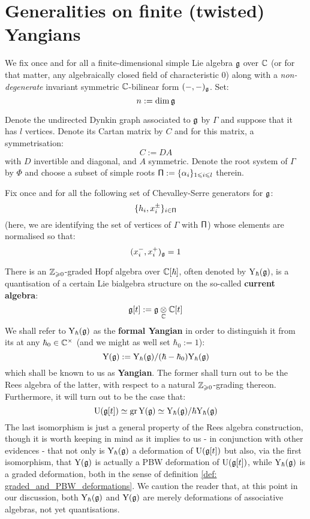 \section{Generalities on finite (twisted) Yangians}
    \begin{convention} \label{conv: a_fixed_semi_simple_lie_algebra}
        We fix once and for all a finite-dimensional simple Lie algebra $\mathfrak{g}$ over $\mathbb{C}$ (or for that matter, any algebraically closed field of characteristic $0$) along with a \textit{non-degenerate} invariant symmetric $\mathbb{C}$-bilinear form $(-, -)_{\mathfrak{g}}$. Set:
            $$n := \dim \mathfrak{g}$$
            
        Denote the undirected Dynkin graph associated to $\mathfrak{g}$ by $\Gamma$ and suppose that it has $l$ vertices. Denote its Cartan matrix by $C$ and for this matrix, a symmetrisation:
            $$C := DA$$
        with $D$ invertible and diagonal, and $A$ symmetric. Denote the root system of $\Gamma$ by $\Phi$ and choose a subset of simple roots $\mathsf{\Pi} := \{\alpha_i\}_{1 \leqslant i \leqslant l}$ therein. 
        
        Fix once and for all the following set of Chevalley-Serre generators for $\mathfrak{g}$:
            $$\{h_i, x_i^{\pm}\}_{i \in \mathsf{\Pi}}$$
        (here, we are identifying the set of vertices of $\Gamma$ with $\mathsf{\Pi}$) whose elements are normalised so that:
            $$(x_i^-, x_i^+)_{\mathfrak{g}} = 1$$
    \end{convention}

    There is an $\mathbb{Z}_{\geqslant 0}$-graded Hopf algebra over $\mathbb{C}[\hbar]$, often denoted by $\mathrm{Y}_{\hbar}(\mathfrak{g})$, is a quantisation of a certain Lie bialgebra structure on the so-called \textbf{current algebra}:
        $$\g[t] := \g \tensor_{\bbC} \bbC[t]$$
    We shall refer to $\mathrm{Y}_{\hbar}(\mathfrak{g})$ as the \textbf{formal Yangian} in order to distinguish it from its  at any $\hbar_0 \in \bbC^{\x}$ (and we might as well set $\hbar_0 := 1$):
        $$\mathrm{Y}(\mathfrak{g}) := \mathrm{Y}_{\hbar}(\mathfrak{g})/(\hbar - \hbar_0)\mathrm{Y}_{\hbar}(\mathfrak{g})$$
    which shall be known to us as  \textbf{Yangian}. The former shall turn out to be the Rees algebra of the latter, with respect to a natural $\mathbb{Z}_{\geqslant 0}$-grading thereon. Furthermore, it will turn out to be the case that:
        $$\mathrm{U}( \mathfrak{g}[t] ) \simeq \operatorname{gr} \mathrm{Y}(\mathfrak{g}) \simeq \mathrm{Y}_{\hbar}(\mathfrak{g})/\hbar\mathrm{Y}_{\hbar}(\mathfrak{g})$$
    The last isomorphism is just a general property of the Rees algebra construction, though it is worth keeping in mind as it implies to us - in conjunction with other evidences - that not only is $\mathrm{Y}_{\hbar}(\mathfrak{g})$ a deformation of $\mathrm{U}( \mathfrak{g}[t] )$ but also, via the first isomorphism, that $\mathrm{Y}(\mathfrak{g})$ is actually a PBW deformation of $\mathrm{U}( \mathfrak{g}[t] )$, while $\mathrm{Y}_{\hbar}(\mathfrak{g})$ is a graded deformation, both in the sense of definition \ref{def: graded_and_PBW_deformations}. We caution the reader that, at this point in our discussion, both $\mathrm{Y}_{\hbar}(\mathfrak{g})$ and $\mathrm{Y}(\mathfrak{g})$ are merely deformations of associative algebras, not yet quantisations. 

